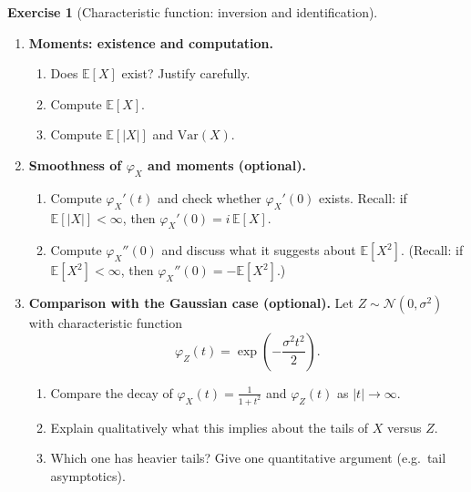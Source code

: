 \documentclass[11pt]{article}
\newcommand{\1}{\mathbf{1}}
\theoremstyle{definition}
\newtheorem{exercise}{Exercise}[section]
\begin{document}
\begin{exercise}[Characteristic function: inversion and identification]
\begin{enumerate}[label=\textbf{(\alph*)}, itemsep=0.35em]
  \item \textbf{Moments: existence and computation.}
  \begin{enumerate}[label=\textbf{(\roman*)}, itemsep=0.2em]
    \item Does $\mathbb E[X]$ exist? Justify carefully.
    \item Compute $\mathbb E[X]$.
    \item Compute $\mathbb E[|X|]$ and $\mathrm{Var}(X)$.
  \end{enumerate}

  \item \textbf{Smoothness of $\varphi_X$ and moments (optional).}
  \begin{enumerate}[label=\textbf{(\roman*)}, itemsep=0.2em]
    \item Compute $\varphi_X'(t)$ and check whether $\varphi_X'(0)$ exists.
    Recall: if $\mathbb E[|X|]<\infty$, then $\varphi_X'(0)=i\,\mathbb E[X]$.
    \item Compute $\varphi_X''(0)$ and discuss what it suggests about $\mathbb E[X^2]$.
    (Recall: if $\mathbb E[X^2]<\infty$, then $\varphi_X''(0)=-\mathbb E[X^2]$.)
  \end{enumerate}

  \item \textbf{Comparison with the Gaussian case (optional).}
  Let $Z\sim\mathcal N(0,\sigma^2)$ with characteristic function
  $$
  \varphi_Z(t)=\exp\!\left(-\frac{\sigma^2 t^2}{2}\right).
  $$
  \begin{enumerate}[label=\textbf{(\roman*)}, itemsep=0.2em]
    \item Compare the decay of $\varphi_X(t)=\frac{1}{1+t^2}$ and $\varphi_Z(t)$ as $|t|\to\infty$.
    \item Explain qualitatively what this implies about the tails of $X$ versus $Z$.
    \item Which one has heavier tails? Give one quantitative argument (e.g.\ tail asymptotics).
  \end{enumerate}

\end{enumerate}
\end{exercise}
\end{document}
